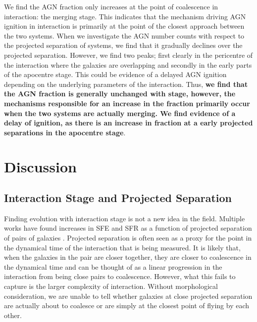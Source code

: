 We find the AGN fraction only increases at the point of coalescence in interaction: the merging stage. This indicates that the mechanism driving AGN ignition in interaction is primarily at the point of the closest approach between the two systems. When we investigate the AGN number counts with respect to the projected separation of systems, we find that it gradually declines over the projected separation. However, we find two peaks; first clearly in the pericentre of the interaction where the galaxies are overlapping and secondly in the early parts of the apocentre stage. This could be evidence of a delayed AGN ignition depending on the underlying parameters of the interaction. Thus, \textbf{we find that the AGN fraction is generally unchanged with stage, however, the mechanisms responsible for an increase in the fraction primarily occur when the two systems are actually merging. We find evidence of a delay of ignition, as there is an increase in fraction at a early projected separations in the apocentre stage}.

\section{Discussion}\label{discussion}
\subsection{Interaction Stage and Projected Separation}
\noindent Finding evolution with interaction stage is not a new idea in the field. Multiple works have found increases in SFE and SFR as a function of projected separation of pairs of galaxies \citep{2000ApJ...530..660B, 2008AJ....135.1877E, 2013MNRAS.433L..59P}. Projected separation is often seen as a proxy for the point in the dynamical time of the interaction that is being measured. It is likely that, when the galaxies in the pair are closer together, they are closer to coalescence in the dynamical time and can be thought of as a linear progression in the interaction from being close pairs to coalescence. However, what this fails to capture is the larger complexity of interaction. Without morphological consideration, we are unable to tell whether galaxies at close projected separation are actually about to coalesce or are simply at the closest point of flying by each other.

